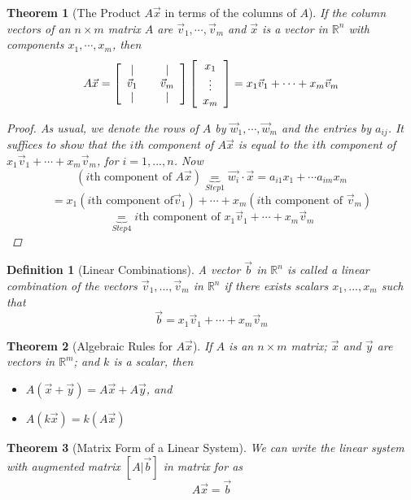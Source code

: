 \documentclass[10pt]{report}
\newtheorem{thm2}{Theorem}[section]
\newtheorem{def2}{Definition}[section]
\begin{document}
\begin{thm2}[The Product $A\vec{x}$ in terms of the columns of $A$]
If the column vectors of an $n\times m$ matrix $A$ are $\vec{v}_1, \cdots , \vec{v}_m$
and $\vec{x}$ is a vector in $\mathbb{R}^n$ with components $x_1, \cdots , x_m$, then
$$A\vec{x}=\left[ \begin{array}{c c c}
| & & |\\
\vec{v}_1 & & \vec{v}_m\\
| & & |
\end{array}\right]\left[ \begin{array}{c}
x_1\\
\vdots\\
x_m
\end{array}\right] = x_1 \vec{v}_1 + \cdots + x_m \vec{v}_m$$
\begin{proof}
As usual, we denote the rows of $A$ by $\vec{w}_1, \cdots , \vec{w}_m$ and the entries by $a_{ij}$. It suffices to show that the $i$th component of $A\vec{x}$ is equal to the $i$th component of $x_1\vec{v}_1 + \cdots + x_m\vec{v}_m$, for $i=1,...,n$. Now
$$(i\text{th component of }A\vec{x})\underbrace{=}_{Step 1} \vec{w_i}\cdot \vec{x} = a_{i1}x_1 + \cdots a_{im}x_m$$
$$= x_1(i\text{th component of} \vec{v}_1) + \cdots + x_m (i\text{th component of } \vec{v}_m)$$
$$\underbrace{=}_{Step 4} i\text{th component of } x_1 \vec{v}_1 + \cdots + x_m \vec{v}_m$$
\end{proof}
\end{thm2}
\begin{def2}[Linear Combinations]
A vector $\vec{b}$ in $\mathbb{R}^n$ is called a linear combination of the vectors $\vec{v}_1,...,\vec{v}_m$ in $\mathbb{R}^n$ if there exists scalars $x_1, ..., x_m$ such that
$$\vec{b} = x_1 \vec{v}_1 + \cdots + x_m \vec{v}_m$$
\end{def2}
\begin{thm2}[Algebraic Rules for $A\vec{x}$]
If $A$ is an $n\times m$ matrix; $\vec{x}$ and $\vec{y}$ are vectors in $\mathbb{R}^m$; and $k$ is a scalar, then
\begin{itemize}
\item[1.] $A(\vec{x} + \vec{y}) = A\vec{x} + A\vec{y}$, and
\item[2.] $A(k\vec{x}) = k(A\vec{x})$
\end{itemize}
\end{thm2}
\begin{thm2}[Matrix Form of a Linear System]
We can write the linear system with augmented matrix $[A|\vec{b}]$ in matrix for as
$$A\vec{x} = \vec{b}$$
\end{thm2}
\end{document}
